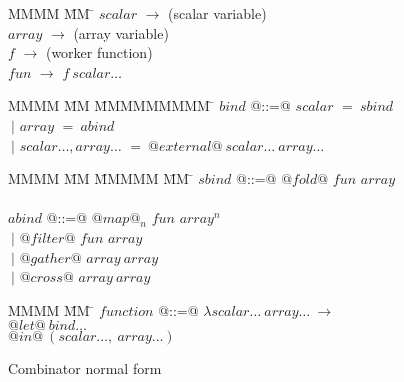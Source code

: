 \begin{figure}
\begin{tabbing}
MMMM        \= MM \= \kill
$scalar$    \> $\to$ \> (scalar variable)      \\
$array$     \> $\to$ \> (array variable)       \\
$f$         \> $\to$ \> (worker function)      \\
$fun$       \> $\to$ \> $f~scalar\ldots$          \\
\end{tabbing}
\begin{tabbing}
MMMM        \= MM \= MMMMMMMMM \= \kill
$bind$      \> @::=@ \> $scalar$ \> $=~sbind$ \\
            \> $~|$    \> $array$  \> $=~abind$ \\
            \> $~|$    \> $scalar\ldots,array\ldots$  \> $=~@external@~scalar\ldots~array\ldots$
\end{tabbing}
\begin{tabbing}
MMMM        \= MM \= MMMMM \= MM \= \kill
$sbind$     \> @::=@ \> $@fold@$  \> $fun$ \> $array$ \\
\\[2ex]

$abind$     \> @::=@ \> $@map@_n$ \> $fun$ \> $array^n$ \\
            \> $~|$    \> $@filter@$\> $fun$ \> $array$ \\
            \> $~|$    \> $@gather@$\>       \> $array~array$ \\
            \> $~|$    \> $@cross@$\>        \> $array~array$ \\
\end{tabbing}
\begin{tabbing}
MMMM        \= MM \= \kill
$function$  \> @::=@ \> $\lambda scalar\ldots~array\ldots~\to$      \\
            \>          \> $@let@~bind\ldots$                  \\
            \>          \> $@in@~(scalar\ldots,~array\ldots)$    \\
\end{tabbing}
\caption{Combinator normal form}
\label{f:CombinatorNormalForm}
\end{figure}

